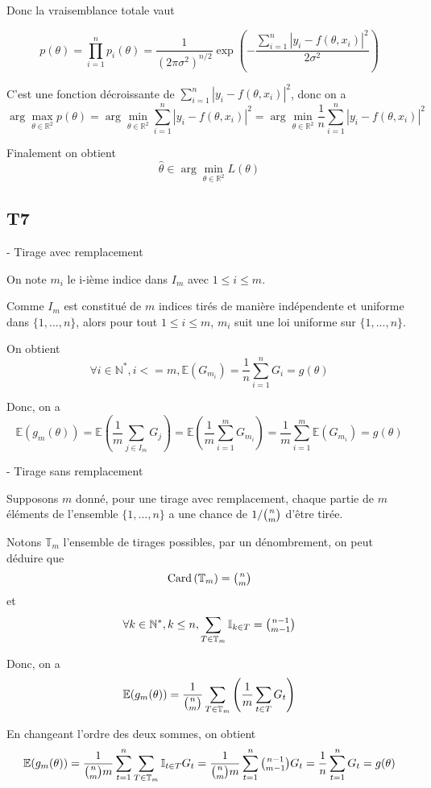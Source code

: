 \documentclass[a4paper,12pt]{article}
\begin{document}
Donc la vraisemblance totale vaut

$$p(\theta) = \prod_{i = 1}^{n} p_i(\theta) = \frac{1}{(2\pi\sigma^2)^{n / 2}} \exp{\left(-\frac{\sum_{i = 1}^{n} |y_i - f(\theta, x_i)|^2}{2\sigma^2}\right)}$$

C'est une fonction décroissante de $\sum_{i = 1}^{n} |y_i - f(\theta, x_i)|^2$, donc on a
$$\arg \max_{\theta\in\mathbb{R}^2}p(\theta) = \arg \min_{\theta\in\mathbb{R}^2} \sum_{i = 1}^{n} |y_i - f(\theta, x_i)|^2 = \arg \min_{\theta\in\mathbb{R}^2} \frac{1}{n}\sum_{i = 1}^{n} |y_i - f(\theta, x_i)|^2$$

Finalement on obtient
$$\hat \theta \in \arg \min_{\theta\in\mathbb{R}^2} L(\theta)$$

\subsection*{T7}

- Tirage avec remplacement

On note $m_i$ le i-ième indice dans $I_m$ avec $1 \le i \le m$.

Comme $I_m$ est constitué de $m$ indices tirés de manière indépendente et uniforme dans $\{1, ..., n\}$, alors pour tout $1 \le i \le m$, $m_i$ suit une loi uniforme sur $\{1, ..., n\}$.

On obtient
$$\forall i \in \mathbb{N}^*, i <= m, \mathbb E(G_{m_i}) = \frac{1}{n} \sum^{n}_{i = 1} G_i = g(\theta) $$

Donc, on a
$$ \mathbb E(g_{m}(\theta)) = \mathbb E(\frac{1}{m} \sum_{j \in I_m} G_j) = \mathbb E(\frac{1}{m} \sum_{i = 1}^{m} G_{m_i}) = \frac{1}{m} \sum_{i = 1}^{m} \mathbb E(G_{m_i}) = g(\theta) $$


- Tirage sans remplacement

Supposons $m$ donné, pour une tirage avec remplacement, chaque partie de $m$ éléments de l'ensemble $\{1, ..., n\}$ a une chance de $1 / \tbinom{n}{m} $ d'être tirée.

Notons $\mathbb{T}_m$ l'ensemble de tirages possibles, par un dénombrement, on peut déduire que
$${\rm Card} \left( \mathbb{T}_m \right) = \tbinom{n}{m}$$
et
$$\forall k \in \mathbb{N}^*, k \le n, \sum_{T \in \mathbb{T}_m} \mathbb{I}_{k \in T} = \tbinom{n - 1}{m - 1} $$

Donc, on a
$$ \mathbb E(g_{m}(\theta)) = \frac{1}{\tbinom{n}{m}} \sum_{T \in \mathbb{T}_m} \left( \frac{1}{m} \sum_{t \in T} G_t \right) $$

En changeant l'ordre des deux sommes, on obtient
$$ \mathbb E(g_{m}(\theta)) = \frac{1}{\tbinom{n}{m}m} \sum_{t = 1}^{n} \sum_{T \in \mathbb{T}_m} \mathbb{I}_{t \in T}G_{t} = \frac{1}{\tbinom{n}{m}m} \sum_{t = 1}^{n} \tbinom{n - 1}{m - 1} G_{t} = \frac{1}{n} \sum_{t = 1}^{n} G_{t} = g(\theta) $$
\end{document}
